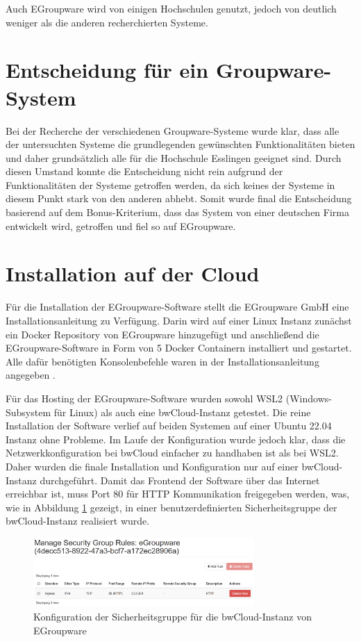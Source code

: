 Auch EGroupware wird von einigen Hochschulen genutzt, jedoch von deutlich weniger als die anderen recherchierten Systeme.


\section{Entscheidung für ein Groupware-System}

Bei der Recherche der verschiedenen Groupware-Systeme wurde klar, dass alle der untersuchten Systeme die grundlegenden gewünschten Funktionalitäten bieten und daher grundsätzlich alle für die Hochschule Esslingen geeignet sind.
Durch diesen Umstand konnte die Entscheidung nicht rein aufgrund der Funktionalitäten der Systeme getroffen werden, da sich keines der Systeme in diesem Punkt stark von den anderen abhebt.
Somit wurde final die Entscheidung basierend auf dem Bonus-Kriterium, dass das System von einer deutschen Firma entwickelt wird, getroffen und fiel so auf EGroupware.




\section{Installation auf der Cloud}

Für die Installation der EGroupware-Software stellt die EGroupware GmbH eine Installationsanleitung zu Verfügung.
Darin wird auf einer Linux Instanz zunächst ein Docker Repository von EGroupware hinzugefügt und anschließend die EGroupware-Software in Form von 5 Docker Containern installiert und gestartet.
Alle dafür benötigten Konsolenbefehle waren in der Installationsanleitung angegeben \autocite[]{egroupware-installation}.

Für das Hosting der EGroupware-Software wurden sowohl WSL2 (Windows-Subsystem für Linux) als auch eine bwCloud-Instanz getestet.
Die reine Installation der Software verlief auf beiden Systemen auf einer Ubuntu 22.04 Instanz ohne Probleme.
Im Laufe der Konfiguration wurde jedoch klar, dass die Netzwerkkonfiguration bei bwCloud einfacher zu handhaben ist als bei WSL2.
Daher wurden die finale Installation und Konfiguration nur auf einer bwCloud-Instanz durchgeführt.
Damit das Frontend der Software über das Internet erreichbar ist, muss Port 80 für HTTP Kommunikation freigegeben werden, was, wie in Abbildung \ref{fig:bwcloud_security_group} gezeigt, in einer benutzerdefinierten Sicherheitsgruppe der bwCloud-Instanz realisiert wurde.
\begin{figure}[H]
    \centering
    \includegraphics[width=0.75\textwidth]{images/bwCloud_SecurityGroup.png}
    \caption{Konfiguration der Sicherheitsgruppe für die bwCloud-Instanz von EGroupware}
    \label{fig:bwcloud_security_group}
\end{figure}


